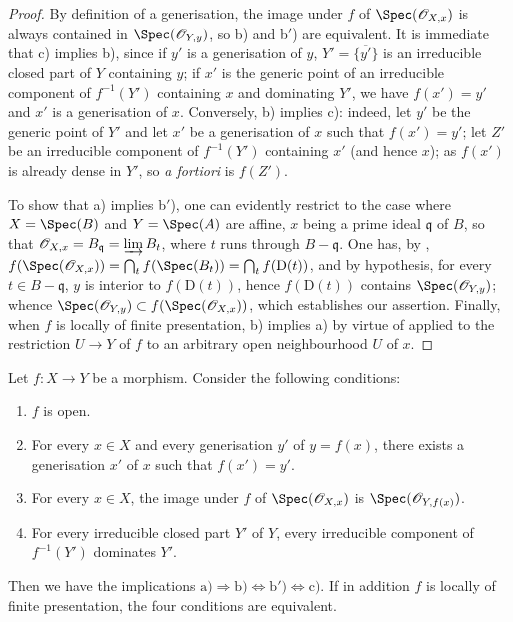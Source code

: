 \begin{proof}
By definition of a generisation, the image under $f$ of $\Spec(\mathcal{O}_{X,x})$ is always contained in $\Spec(\mathcal{O}_{Y,y})$, so b) and b$'$) are equivalent.
It is immediate that c) implies b), since if $y'$ is a generisation of $y$, $Y'=\overline{\{y'\}}$ is an irreducible closed part of $Y$ containing $y$; if $x'$ is the generic point of an irreducible component of $f^{-1}(Y')$ containing $x$ and dominating $Y'$, we have $f(x')=y'$  and $x'$ is a generisation of $x$.
Conversely, b) implies c): indeed, let $y'$ be the generic point of $Y'$ and let $x'$ be a generisation of $x$ such that $f(x')=y'$; let $Z'$ be an irreducible component of $f^{-1}(Y')$ containing $x'$ (and hence $x$); as $f(x')$ is already dense in $Y'$, so \emph{a fortiori} is $f(Z')$.

To show that a) implies b$'$), one can evidently restrict to the case where $X=\Spec(B)$ and $Y=\Spec(A)$ are affine, $x$ being a prime ideal $\mathfrak{q}$ of $B$, so that $\mathcal{O}_{X,x}=B_\mathfrak{q}=\varinjlim B_t$,
where $t$ runs through $B-\mathfrak{q}$.
One has, by , $f(\Spec(\mathcal{O}_{X,x}))=\bigcap_t f(\Spec(B_t))=\bigcap_t f(\mathrm{D}(t))$, and by hypothesis, for every $t\in B-\mathfrak{q}$, $y$ is interior to $f(\mathrm{D}(t))$, hence $f(\mathrm{D}(t))$ contains $\Spec(\mathcal{O}_{Y,y})$; whence $\Spec(\mathcal{O}_{Y,y})\subset f(\Spec(\mathcal{O}_{X,x}))$, which establishes our assertion.
Finally, when $f$ is locally of finite presentation, b) implies a) by virtue of  applied to the restriction $U\to Y$ of $f$ to an arbitrary open neighbourhood $U$ of $x$.
\end{proof}

\begin{corollary}[1.10.4]
\label{IV.1.10.4}
Let $f:X\to Y$ be a morphism.
Consider the following conditions:
\begin{enumerate}
  \item[\rm a)] $f$ is open.
  \item[\rm b)] For every $x\in X$ and every generisation $y'$ of $y=f(x)$, there exists a generisation $x'$ of $x$ such that $f(x')=y'$.
  \item[\rm b$'$)] For every $x\in X$, the image under $f$ of $\Spec(\mathcal{O}_{X,x})$ is $\Spec(\mathcal{O}_{Y,f(x)})$.
  \item[\rm c)] For every irreducible closed part $Y'$ of $Y$, every irreducible component of $f^{-1}(Y')$ dominates $Y'$.
\end{enumerate}
Then we have the implications $\mathrm{a)}\Rightarrow\mathrm{b)}\Leftrightarrow\mathrm{b')}\Leftrightarrow\mathrm{c)}$.
If in addition $f$ is locally of finite presentation, the four conditions are equivalent.
\end{corollary}

